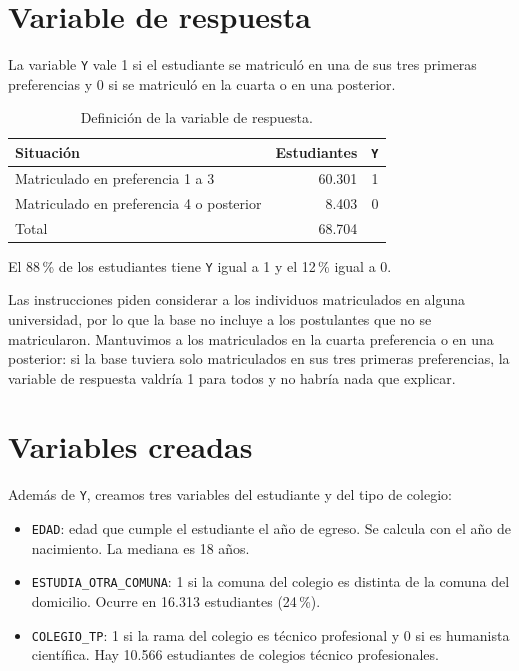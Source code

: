 \documentclass[11pt,letterpaper]{article}
\begin{document}
\section{Variable de respuesta}

La variable \texttt{Y} vale 1 si el estudiante se matriculó en una de sus tres primeras preferencias y 0 si se matriculó en la cuarta o en una posterior.

\begin{table}[h]
\centering
\begin{tabular}{lrr}
\toprule
Situación & Estudiantes & \texttt{Y} \\
\midrule
Matriculado en preferencia 1 a 3 & 60.301 & 1 \\
Matriculado en preferencia 4 o posterior & 8.403 & 0 \\
\midrule
Total & 68.704 & \\
\bottomrule
\end{tabular}
\caption{Definición de la variable de respuesta.}
\end{table}

El 88\,\% de los estudiantes tiene \texttt{Y} igual a 1 y el 12\,\% igual a 0.

Las instrucciones piden considerar a los individuos matriculados en alguna universidad, por lo que la base no incluye a los postulantes que no se matricularon. Mantuvimos a los matriculados en la cuarta preferencia o en una posterior: si la base tuviera solo matriculados en sus tres primeras preferencias, la variable de respuesta valdría 1 para todos y no habría nada que explicar.

\section{Variables creadas}

Además de \texttt{Y}, creamos tres variables del estudiante y del tipo de colegio:

\begin{itemize}
\item \texttt{EDAD}: edad que cumple el estudiante el año de egreso. Se calcula con el año de nacimiento. La mediana es 18 años.
\item \texttt{ESTUDIA\_OTRA\_COMUNA}: 1 si la comuna del colegio es distinta de la comuna del domicilio. Ocurre en 16.313 estudiantes (24\,\%).
\item \texttt{COLEGIO\_TP}: 1 si la rama del colegio es técnico profesional y 0 si es humanista científica. Hay 10.566 estudiantes de colegios técnico profesionales.
\end{itemize}
\end{document}
